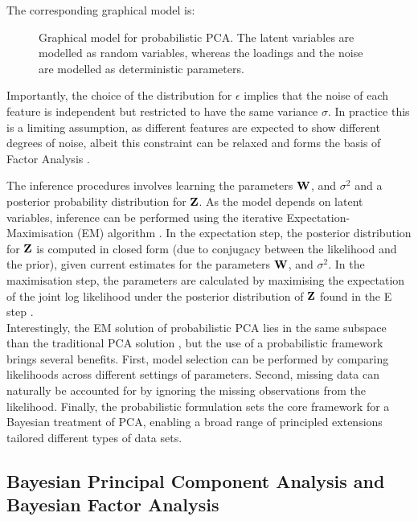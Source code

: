 The corresponding graphical model is:

\begin{figure}[H]
	\centering
	
	\caption{Graphical model for probabilistic PCA. The latent variables are modelled as random variables, whereas the loadings and the noise are modelled as deterministic parameters.}
	\label{fig:pPCA}
\end{figure}

Importantly, the choice of the distribution for $\epsilon$ implies that the noise of each feature is independent but restricted to have the same variance $\sigma$. In practice this is a limiting assumption, as different features are expected to show different degrees of noise, albeit this constraint can be relaxed and forms the basis of Factor Analysis \cite{Rubin1982,Bishop}.

The inference procedures involves learning the parameters ${\bf W}$, and $\sigma^2$ and a posterior probability distribution for ${\bf Z}$. As the model depends on latent variables, inference can be performed using the iterative Expectation-Maximisation (EM) algorithm \cite{Rubin1982,Bishop}. In the expectation step, the posterior distribution for ${\bf Z}$ is computed in closed form (due to conjugacy between the likelihood and the prior), given current estimates for the parameters ${\bf W}$, and $\sigma^2$. In the maximisation step, the parameters are calculated by maximising the expectation of the joint log likelihood under the posterior distribution of ${\bf Z}$ found in the E step \cite{Tipping1999}.\\
Interestingly, the EM solution of probabilistic PCA lies in the same subspace than the traditional PCA solution \cite{Tipping1999}, but the use of a probabilistic framework brings several benefits. First, model selection can be performed by comparing likelihoods across different settings of parameters. Second, missing data can naturally be accounted for by ignoring the missing observations from the likelihood. Finally, the probabilistic formulation sets the core framework for a Bayesian treatment of PCA, enabling a broad range of principled extensions tailored different types of data sets.


\subsection{Bayesian Principal Component Analysis and Bayesian Factor Analysis} \label{section:bayesian_pca}

